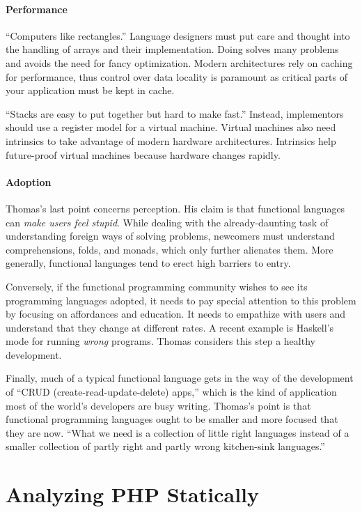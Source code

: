 \documentclass{jfp1}
\begin{document}
\paragraph{Performance} ``Computers like rectangles.''  Language designers
must put care and thought into the handling of arrays and their
implementation. Doing solves many problems and avoids the need for fancy
optimization. Modern architectures rely on caching for performance, thus
control over data locality is paramount as critical parts of your
application must be kept in cache. 

``Stacks are easy to put together but hard to make fast.''  Instead,
implementors should use a register model for a virtual machine. Virtual
machines also need intrinsics to take advantage of modern hardware
architectures.  Intrinsics help future-proof virtual machines because
hardware changes rapidly.

\paragraph{Adoption} Thomas's last point concerns perception. His claim is
that functional languages can \textit{make users feel stupid}. While
dealing with the already-daunting task of understanding foreign ways of
solving problems, newcomers must understand comprehensions, folds, and
monads, which only further alienates them.  More generally, functional
languages tend to erect high barriers to entry. 

Conversely, if the functional programming community wishes to see its
programming languages adopted, it needs to pay special attention to this
problem by focusing on affordances and education. It needs to empathize
with users and understand that they change at different rates. A recent
example is Haskell's mode for running \textit{wrong} programs. Thomas
considers this step a healthy development.

Finally, much of a typical functional language gets in the way of the
development of ``CRUD (create-read-update-delete) apps,'' which is the kind
of application most of the world's developers are busy writing. Thomas's
point is that functional programming languages ought to be smaller and more
focused that they are now. ``What we need is a collection of little right
languages instead of a smaller collection of partly right and partly wrong
kitchen-sink languages.''

\section{Analyzing PHP Statically}
\end{document}
